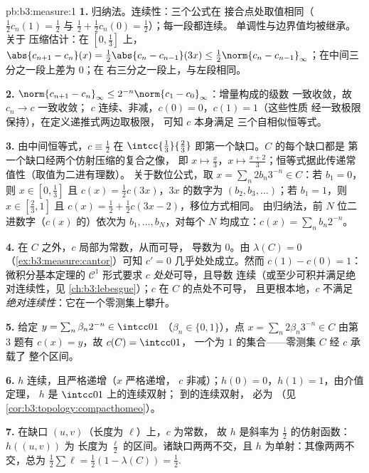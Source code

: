 \begin{solution}{pb:b3:measure:1}
\textbf{1.} 归纳法。连续性：三个公式在
接合点处取值相同（$\frac12c_n(1) = \frac12$ 与 $\frac12 +
\frac12c_n(0) = \frac12$）；每一段都连续。
单调性与边界值均被继承。关于
压缩估计：在 $[0,\frac13]$ 上，$\abs{c_{n+1} - c_n}(x)
= \frac12\abs{c_n - c_{n-1}}(3x) \leq \frac12\norm{c_n -
c_{n-1}}_\infty$；在中间三分之一段上差为 $0$；在
右三分之一段上，与左段相同。

\textbf{2.} $\norm{c_{n+1} - c_n}_\infty \leq
2^{-n}\norm{c_1 - c_0}_\infty$：增量构成的级数
一致收敛，故 $c_n \to c$ 一致收敛；
$c$ 连续、非减，$c(0) = 0$，$c(1) = 1$（这些性质
经一致极限保持），在定义递推式两边取极限，
可知 $c$ 本身满足
三个自相似恒等式。

\textbf{3.} 由中间恒等式，$c \equiv \frac12$ 在
$\intcc{\frac13}{\frac23}$ 即第一个缺口。$C$ 的每个缺口都是
第一个缺口经两个仿射压缩的复合之像，
即 $x \mapsto \frac x3$，$x\mapsto\frac{x +
2}3$；恒等式据此传递常值性（取值为二进有理数）。
关于数位公式，取 $x =
\sum_n 2b_n3^{-n} \in C$：若 $b_1 = 0$，则 $x \in
[0,\frac13]$ 且 $c(x) = \frac12c(3x)$，$3x$ 的数字为
$(b_2, b_3, \dots)$；若 $b_1 = 1$，则 $x \in [\frac23, 1]$
且 $c(x) = \frac12 + \frac12c(3x - 2)$，移位方式相同。
由归纳法，前 $N$ 位二进数字（$c(x)$ 的）依次为 $b_1,
\dots, b_N$，对每个 $N$ 均成立：$c(x) = \sum_nb_n2^{-n}$。

\textbf{4.} 在 $C$ 之外，$c$ 局部为常数，从而可导，
导数为 $0$。由 $\lambda(C) = 0$
（\cref{ex:b3:measure:cantor}）可知 $c' = 0$ 几乎处处成立。然而
$c(1) - c(0) = 1$：微积分基本定理的 $\mathcal
C^1$ 形式要求 $c$ \emph{处处}可导，且导数
连续（或至少可积并满足绝对连续性，见
\cref{ch:b3:lebesgue}）；$c$ 在 $C$ 的点处不可导，
且更根本地，$c$ 不满足
\emph{绝对连续性}：它在一个零测集上攀升。

\textbf{5.} 给定 $y = \sum_n\beta_n2^{-n} \in \intcc01$
（$\beta_n \in \{0,1\}$），点 $x = \sum_n2\beta_n3^{-n}
\in C$ 由第 3 题有 $c(x) = y$，故 $c(C) = \intcc01$，
一个为 $1$ 的集合——零测集 $C$ 经 $c$ 承载了
整个区间。

\textbf{6.} $h$ 连续，且严格递增（$x$ 严格递增，
$c$ 非减）；$h(0) = 0$，$h(1) = 1$，由介值定理，
$h$ 是 $\intcc01$ 上的连续双射；
到的连续双射，
必为
（见\cref{cor:b3:topology:compacthomeo}）。

\textbf{7.} 在缺口 $(u, v)$（长度为 $\ell$）上，$c$ 为常数，
故 $h$ 是斜率为 $\frac12$ 的仿射函数：$h((u,v))$ 为
长度为 $\frac\ell2$ 的区间。诸缺口两两不交，且 $h$
为单射：其像两两不交，总为
$\frac12\sum\ell = \frac12(1 - \lambda(C)) = \frac12$.


\end{solution}
